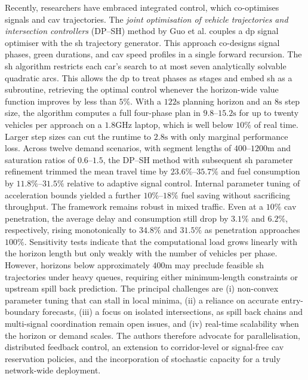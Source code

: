 \mynewline
Recently, researchers have embraced integrated control, which co-optimises signals and \ac{cav} trajectories. The \textit{joint optimisation of vehicle trajectories and intersection controllers} (DP–SH) method by Guo et al. \cite{Guo2019} couples a \ac{dp} signal optimiser with the \ac{sh} trajectory generator. This approach co-designs signal phases, green durations, and \ac{cav} speed profiles in a single forward recursion. The \ac{sh} algorithm restricts each car’s search to at most seven analytically solvable quadratic arcs. This allows the \ac{dp} to treat phases as stages and embed \ac{sh} as a subroutine, retrieving the optimal control whenever the horizon-wide value function improves by less than $5\%$. With a $122\unit{\second}$ planning horizon and an $8\unit{\second}$ step size, the algorithm computes a full four-phase plan in $9.8$–$15.2\unit{\second}$ for up to twenty vehicles per approach on a $1.8\unit{\giga\hertz}$ laptop, which is well below $10\%$ of real time. Larger step sizes can cut the runtime to $2.8\unit{\second}$ with only marginal performance loss. Across twelve demand scenarios, with segment lengths of $400$–$1200\unit{\metre}$ and saturation ratios of $0.6$--$1.5$, the DP–SH method with subsequent \ac{sh} parameter refinement trimmed the mean travel time by $23.6\%$--$35.7\%$ and fuel consumption by $11.8\%$--$31.5\%$ relative to adaptive signal control. Internal parameter tuning of acceleration bounds yielded a further $10\%$--$18\%$ fuel saving without sacrificing throughput. The framework remains robust in mixed traffic. Even at a $10\%$ \ac{cav} penetration, the average delay and consumption still drop by $3.1\%$ and $6.2\%$, respectively, rising monotonically to $34.8\%$ and $31.5\%$ as penetration approaches $100\%$. Sensitivity tests indicate that the computational load grows linearly with the horizon length but only weakly with the number of vehicles per phase. However, horizons below approximately $400\unit{\metre}$ may preclude feasible \ac{sh} trajectories under heavy queues, requiring either minimum-length constraints or upstream spill back prediction. The principal challenges are (i) non-convex parameter tuning that can stall in local minima, (ii) a reliance on accurate entry-boundary forecasts, (iii) a focus on isolated intersections, as spill back chains and multi-signal coordination remain open issues, and (iv) real-time scalability when the horizon or demand scales. The authors therefore advocate for parallelisation, distributed feedback control, an extension to corridor-level or signal-free \ac{cav} reservation policies, and the incorporation of stochastic capacity for a truly network-wide deployment.
